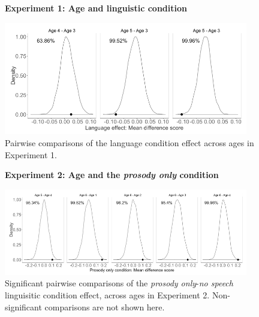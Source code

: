 \documentclass[authoryear, 12pt]{elsarticle}
\begin{document}
\begin{figure}
\begin{center}
\textbf{Experiment 1: Age and linguistic condition}\par\medskip
\includegraphics[width=0.95\textwidth]{figures/E1-child-randvsreal-ttest-agebylg.png}
\end{center}
\caption{Pairwise comparisons of the language condition effect across ages in Experiment 1.}
\label{fig:E1-lgageinteraction}
\end{figure}

\begin{figure}
\begin{center}
\textbf{Experiment 2: Age and the \textit{prosody only} condition}\par\medskip
\includegraphics[width=0.95\textwidth]{figures/E2-child-randvsreal-ttest-muffledages.png}
\end{center}
\caption{Significant pairwise comparisons of the \textit{prosody only}-\textit{no speech} linguisitic condition effect, across ages in Experiment 2. Non-significant comparisons are not shown here.}
\label{fig:E2-lgageinteraction}
\end{figure}
\end{document}
